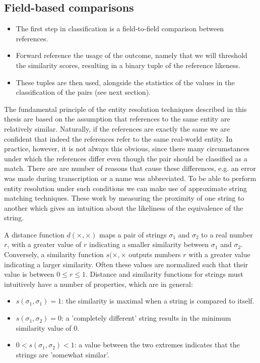 \documentclass[paper=a4, fontsize=11pt]{scrartcl}
\begin{document}

\subsection{Field-based comparisons}
\begin{itemize}
    \item The first step in classification is a field-to-field comparison between references.
    \item Forward reference the usage of the outcome, namely that we will threshold the similarity scores, resulting in a binary tuple of the reference likeness.
    \item These tuples are then used, alongside the statistics of the values in the classification of the pairs (see next section).
\end{itemize}

The fundamental principle of the entity resolution techniques described in this thesis are based on the assumption that references to the same entity are relatively similar.
Naturally, if the references are exactly the same we are confident that indeed the references refer to the same real-world entity.
In practice, however, it is not always this obvious, since there many circumstances under which the references differ even though the pair should be classified as a match.
There are are number of reasons that cause these differences, e.g. an error was made during transcription or a name was abbreviated.
To be able to perform entity resolution under such conditions we can make use of approximate string matching techniques.
These work by measuring the proximity of one string to another which gives an intuition about the likeliness of the equivalence of the string.

A distance function $d(\times, \times)$ maps a pair of strings $\sigma_1$ and $\sigma_2$ to a real number $r$, with a greater value of $r$ indicating a smaller similarity between $\sigma_1$ and $\sigma_2$.\cite{cohen03}
Conversely, a similarity function $s(\times, \times$ outputs numbers $r$ with a greater value indicating a larger similarity.
Often these values are normalized such that their value is between $0 \leq r \leq 1$.
Distance and similarity functions for strings must intuitively have a number of properties, which are in general:\cite{christen12}

\begin{itemize}
    \item $s(\sigma_1, \sigma_1)=1$: the similarity is maximal when a string is compared to itself.
    \item $s(\sigma_1, \sigma_2)=0$: a 'completely different' string results in the minimum similarity value of $0$.
    \item $0 < s(\sigma_1, \sigma_2) < 1$: a value between the two extremes indicates that the strings are 'somewhat similar'.
\end{itemize}
\end{document}
